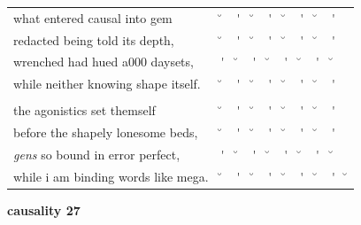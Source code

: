 \documentclass[12pt, landscape]{article}
\begin{document}
\begin{center}
\begin{tabularx}{\textwidth}{
>{\lefting\arraybackslash}X
c
c
c
c
c
c
c
c
c
}

what entered causal into gem & \u{} & \'{} & \u{} & \'{} & \u{} & \'{} & \u{} & \'{} & \\
redacted being told its depth, & \u{} & \'{} & \u{} & \'{} & \u{} & \'{} & \u{} & \'{} & \\
wrenched had hued a000 daysets, & \'{} & \u{} & \'{} & \u{} & \'{} & \u{} & \'{} & \u{} & \\
while neither knowing shape itself. & \u{} & \'{} & \u{} & \'{} & \u{} & \'{} & \u{} & \'{} & \\
 & & & & & & & & \\
the agonistics set themself & \u{} & \'{} & \u{} & \'{} & \u{} & \'{} & \u{} & \'{} & \\
before the shapely lonesome beds, & \u{} & \'{} & \u{} & \'{} & \u{} & \'{} & \u{} & \'{} & \\
\textit{gens} so bound in error perfect, & \'{} & \u{} & \'{} & \u{} & \'{} & \u{} & \'{} & \u{} & \\
while i am binding words like mega. & \u{} & \'{} & \u{} & \'{} & \u{} & \'{} & \u{} & \'{} & \u{} \\

\end{tabularx}
\end{center}

\vspace*{\fill}

\newpage

\vspace*{\fill}

\noindent \textbf{causality 27}
\noindent \hfill \par
\end{document}
